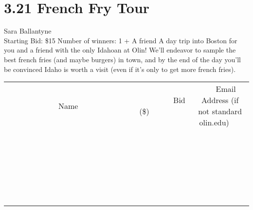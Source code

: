 \documentclass[11pt]{article}
\begin{document}
\section*{3.21 French Fry Tour }
Sara Ballantyne
\\
Starting Bid: \$15
\newline
Number of winners: 1 + A friend 
\newline
A day trip into Boston for you and a friend with the only Idahoan at Olin! We'll endeavor to sample the best french fries (and maybe burgers) in town, and by the end of the day you'll be convinced Idaho is worth a visit (even if it's only to get more french fries).
\\[6ex]
\begin{tabular}{c c c}
~~~~~~~~~~~~~Name~~~~~~~~~~~~~ & ~~~~~~~~~Bid (\$)~~~~~~~~~  & ~~~Email Address (if not standard olin.edu)~~~\\
 & & \\
\hline
 & & \\
\hline
 & & \\
\hline
 & & \\
\hline
 & & \\
\hline
 & & \\
\hline
 & & \\
\hline
 & & \\
\hline
 & & \\
\hline
 & & \\
\hline
 & & \\
\hline
 & & \\
\hline
 & & \\
\hline
 & & \\
\hline
 & & \\
\hline
 & & \\
\hline
 & & \\
\hline
 & & \\
\hline
 & & \\
\hline
 & & \\
\hline
 & & \\
\hline
 & & \\
\hline
 & & \\
\hline
 & & \\
\hline
 & & \\
\hline
 & & \\
\hline
\end{tabular}
\newpage
\end{document}

